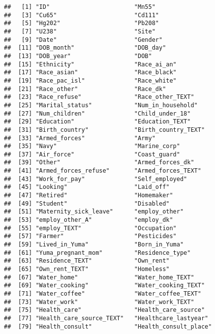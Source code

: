 \documentclass[]{article}
\begin{document}
\begin{verbatim}
##   [1] "ID"                        "Mn55"                     
##   [3] "Cu65"                      "Cd111"                    
##   [5] "Hg202"                     "Pb208"                    
##   [7] "U238"                      "Site"                     
##   [9] "Date"                      "Gender"                   
##  [11] "DOB_month"                 "DOB_day"                  
##  [13] "DOB_year"                  "DOB"                      
##  [15] "Ethnicity"                 "Race_ai_an"               
##  [17] "Race_asian"                "Race_black"               
##  [19] "Race_pac_isl"              "Race_white"               
##  [21] "Race_other"                "Race_dk"                  
##  [23] "Race_refuse"               "Race_other_TEXT"          
##  [25] "Marital_status"            "Num_in_household"         
##  [27] "Num_children"              "Child_under_18"           
##  [29] "Education"                 "Education_TEXT"           
##  [31] "Birth_country"             "Birth_country_TEXT"       
##  [33] "Armed_forces"              "Army"                     
##  [35] "Navy"                      "Marine_corp"              
##  [37] "Air_force"                 "Coast_guard"              
##  [39] "Other"                     "Armed_forces_dk"          
##  [41] "Armed_forces_refuse"       "Armed_forces_TEXT"        
##  [43] "Work_for_pay"              "Self_employed"            
##  [45] "Looking"                   "Laid_off"                 
##  [47] "Retired"                   "Homemaker"                
##  [49] "Student"                   "Disabled"                 
##  [51] "Maternity_sick_leave"      "employ_other"             
##  [53] "employ_other_A"            "employ_dk"                
##  [55] "employ_TEXT"               "Occupation"               
##  [57] "Farmer"                    "Pesticides"               
##  [59] "Lived_in_Yuma"             "Born_in_Yuma"             
##  [61] "Yuma_pregnant_mom"         "Residence_type"           
##  [63] "Residence_TEXT"            "Own_rent"                 
##  [65] "Own_rent_TEXT"             "Homeless"                 
##  [67] "Water_home"                "Water_home_TEXT"          
##  [69] "Water_cooking"             "Water_cooking_TEXT"       
##  [71] "Water_coffee"              "Water_coffee_TEXT"        
##  [73] "Water_work"                "Water_work_TEXT"          
##  [75] "Health_care"               "Health_care_source"       
##  [77] "Health_care_source_TEXT"   "Healthcare_lastyear"      
##  [79] "Health_consult"            "Health_consult_place"     

\end{verbatim}
\end{document}
